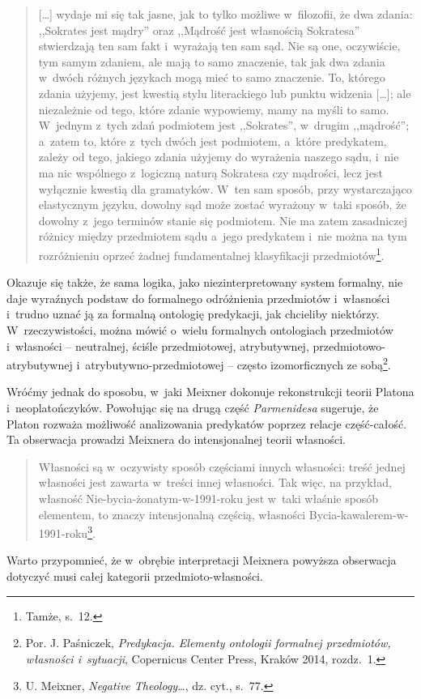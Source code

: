 \begin{quote}
[\ldots] wydaje mi się tak jasne, jak to tylko możliwe w~filozofii, że dwa zdania: ,,Sokrates jest mądry'' oraz ,,Mądrość jest własnością Sokratesa'' stwierdzają ten sam fakt i~wyrażają ten sam sąd. Nie są one, oczywiście, tym samym zdaniem, ale mają to samo znaczenie, tak jak dwa zdania w~dwóch różnych językach mogą mieć to samo znaczenie. To, którego zdania użyjemy, jest kwestią stylu literackiego lub punktu widzenia [\ldots]; ale niezależnie od tego, które zdanie wypowiemy, mamy na myśli to samo. W~jednym z~tych zdań podmiotem jest ,,Sokrates'', w~drugim ,,mądrość''; a~zatem to, które z~tych dwóch jest podmiotem, a~które predykatem, zależy od tego, jakiego zdania użyjemy do wyrażenia naszego sądu, i~nie ma nic wspólnego z~logiczną naturą Sokratesa czy mądrości, lecz jest wyłącznie kwestią dla gramatyków. W~ten sam sposób, przy wystarczająco elastycznym języku, dowolny sąd może zostać wyrażony w~taki sposób, że dowolny z~jego terminów stanie się podmiotem. Nie ma zatem zasadniczej różnicy między przedmiotem sądu a~jego predykatem i~nie można na tym rozróżnieniu oprzeć żadnej fundamentalnej klasyfikacji przedmiotów\footnote{Tamże, s.~12.}.
\end{quote}
Okazuje się także, że sama logika, jako niezinterpretowany system formalny, nie daje wyraźnych podstaw do formalnego odróżnienia przedmiotów i~własności i~trudno uznać ją za formalną ontologię predykacji, jak chcieliby niektórzy. W~rzeczywistości, można mówić o~wielu formalnych ontologiach przedmiotów i~własności -- neutralnej, ściśle przedmiotowej, atrybutywnej, przedmiotowo-atrybutywnej i~atrybutywno-przedmiotowej -- często izomorficznych ze sobą\footnote{Por. J. Paśniczek, \textit{Predykacja. Elementy ontologii formalnej przedmiotów, własności i~sytuacji}, Copernicus Center Press, Kraków 2014, rozdz.~1.}.

Wróćmy jednak do sposobu, w~jaki Meixner dokonuje rekonstrukcji teorii Platona i~neoplatończyków. Powołując się na drugą część \textit{Parmenidesa} sugeruje, że Platon rozważa możliwość analizowania predykatów poprzez relacje część-całość. Ta obserwacja prowadzi Meixnera do intensjonalnej teorii własności.

\begin{quote}
Własności są w~oczywisty sposób częściami innych własności: treść jednej własności jest zawarta w~treści innej własności. Tak więc, na przykład, własność Nie-bycia-żonatym-w-1991-roku jest w~taki właśnie sposób elementem, to znaczy intensjonalną częścią, własności Bycia-kawalerem-w-1991-roku\footnote{U. Meixner, \textit{Negative Theology\ldots}, dz. cyt., s.~77.}.
\end{quote}
Warto przypomnieć, że w~obrębie interpretacji Meixnera powyższa obserwacja dotyczyć musi całej kategorii przedmioto-własności.

